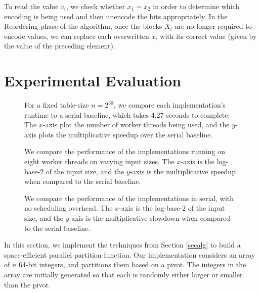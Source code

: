 \documentclass[sigplan, twocolumn]{amsart}
\theoremstyle{remark}
\theoremstyle{remark}
\begin{document}
To read the value $v_i$, we check whether $x_1 = x_2$ in order to
determine which encoding is being used and then unencode the bits
appropriately. In the Reordering phase of the algorithm, once the
blocks $X_i$ are no longer required to encode values, we can replace
each overwritten $x_i$ with its correct value (given by the value of
the preceding element).


\section{Experimental Evaluation}\label{secexp}

\begin{figure*}[t]
  \begin{center}
  \begin{subfigure}[t]{0.45\textwidth}
    \CILKtable
    \caption{For a fixed table-size $n = 2^{30}$, we compare each
      implementation's runtime to a serial baseline, which takes 4.27
      seconds to complete. The $x$-axis plot the number of worker
      threads being used, and the $y$-axis plots the multiplicative
      speedup over the serial baseline.}
    \label{tablecilk}
  \end{subfigure}
  \hspace{.5cm}
  \begin{subfigure}[t]{0.45\textwidth}
    \CILKtabletwo
    \caption{We compare the performance of the implementations running
      on eight worker threads on varying input sizes. The $x$-axis is
      the log-base-$2$ of the input size, and the $y$-axis is the
      multiplicative speedup when compared to the serial baseline.}
    \label{tablecilk2}
  \end{subfigure}


  \begin{subfigure}[t]{0.45\textwidth}
    \serialtable
    \caption{We compare the performance of the implementations in
      serial, with no scheduling overhead. The $x$-axis is the
      log-base-$2$ of the input size, and the $y$-axis is the
      multiplicative slowdown when compared to the serial baseline.}
    \label{tableserial}
  \end{subfigure}

  
  \end{center}
  \caption{}
  \label{fig1}
\end{figure*}


In this section, we implement the techniques from Section \ref{secalg}
to build a space-efficient parallel partition function. Our
implementation considers an array of $n$ 64-bit integers, and
partitions them based on a pivot. The integers in the array are
initially generated so that each is randomly either larger or smaller
than the pivot.
\end{document}
